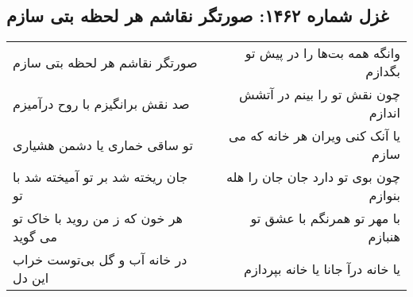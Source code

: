 \begin{center}
\section*{غزل شماره ۱۴۶۲: صورتگر نقاشم هر لحظه بتی سازم}
\label{sec:1462}
\begin{longtable}{l p{0.5cm} r}
صورتگر نقاشم هر لحظه بتی سازم
&&
وانگه همه بت‌ها را در پیش تو بگدازم
\\
صد نقش برانگیزم با روح درآمیزم
&&
چون نقش تو را بینم در آتشش اندازم
\\
تو ساقی خماری یا دشمن هشیاری
&&
یا آنک کنی ویران هر خانه که می سازم
\\
جان ریخته شد بر تو آمیخته شد با تو
&&
چون بوی تو دارد جان جان را هله بنوازم
\\
هر خون که ز من روید با خاک تو می گوید
&&
با مهر تو همرنگم با عشق تو هنبازم
\\
در خانه آب و گل بی‌توست خراب این دل
&&
یا خانه درآ جانا یا خانه بپردازم
\\
\end{longtable}
\end{center}
